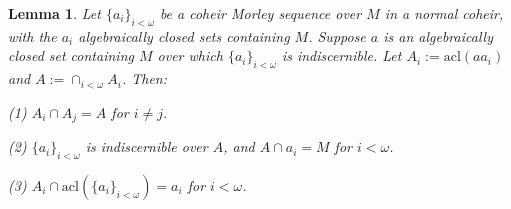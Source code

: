 \documentclass{amsart}
\newtheorem{lemma}[theorem]{Lemma}
\theoremstyle{definition}
\theoremstyle{remark}
\numberwithin{equation}{section}
\begin{document}
\begin{lemma}
  \label{normal coheir sequence indiscernible over a set}  Let $\{a_{i}\}_{i < \omega}$ be a coheir Morley sequence over $M$ in a normal coheir, with the $a_{i}$ algebraically closed sets containing $M$. Suppose $a$ is an algebraically closed set containing $M$ over which $\{a_i\}_{i < \omega}$ is indiscernible. Let $A_{i}:= \mathrm{acl}(aa_i)$ and $A := \cap_{i < \omega} A_{i}$. Then:

    (1) $A_{i} \cap A_{j} = A$ for $i \neq j$.

    (2) $\{a_{i}\}_{i < \omega}$ is indiscernible over $A$, and $A \cap a_{i} = M$ for $i < \omega$.

    (3) $A_{i} \cap \mathrm{acl}(\{a_{i}\}_{i < \omega}) = a_{i}$ for $ i < \omega$.
\end{lemma}
\end{document}
